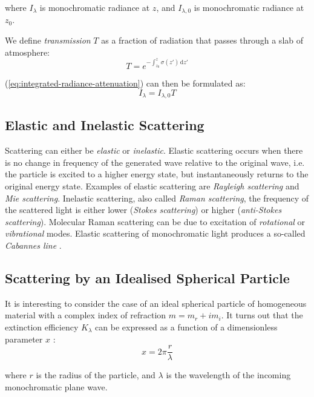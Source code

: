 \noindent where $I_\lambda$ is monochromatic radiance at $z$, and $I_{\lambda,0}$ is monochromatic radiance
at $z_0$.

\noindent We define \textit{transmission} $T$ as a fraction of radiation that
passes through a slab of atmosphere:
\begin{equation}\label{eq:transmission}
T = e^{-\int_{z_0}^z \sigma(z')\,\mathrm{d}z'}
\end{equation}

\noindent (\ref{eq:integrated-radiance-attenuation}) can then be formulated as:
\begin{equation}
I_\lambda = I_{\lambda,0} T
\end{equation}

\subsection{Elastic and Inelastic Scattering}
Scattering can either be \textit{elastic} or \textit{inelastic}.
Elastic scattering occurs when there is no change in frequency of the generated
wave relative to the original wave, i.e. the particle is excited to a higher
energy state, but instantaneously returns to the original energy state.
Examples of elastic scattering are \textit{Rayleigh scattering} and \textit{Mie scattering}.
Inelastic scattering, also called \textit{Raman scattering}, the frequency of
the scattered light is either lower (\textit{Stokes scattering}) or higher
(\textit{anti-Stokes scattering}). Molecular Raman scattering can be due to
excitation of \textit{rotational} or \textit{vibrational} modes. Elastic
scattering of monochromatic light produces a so-called \textit{Cabannes line}
\citep{She2001}.

\subsection{Scattering by an Idealised Spherical Particle}
It is interesting to consider the case of an ideal spherical particle of
homogeneous material with a complex index of refraction $m = m_r + i m_i$. It
turns out that the extinction efficiency $K_\lambda$ can be expressed as a function of a
dimensionless parameter $x$ \citep{WallaceHobbs2006}:
\begin{equation}\label{eq:x}
x = 2\pi \frac{r}{\lambda}
\end{equation}

\noindent where $r$ is the radius of the particle, and $\lambda$ is the
wavelength of the incoming monochromatic plane wave.

